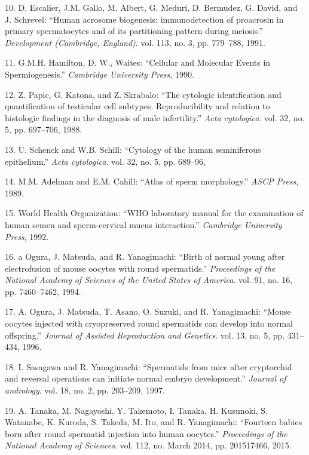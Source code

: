 \documentclass[12pt,twoside]{ugathesis}
\theoremstyle{definition}
\theoremstyle{definition}
\theoremstyle{remark}
\begin{document}
\hypertarget{ref-Escalier1991}{}
10. D. Escalier, J.M. Gallo, M. Albert, G. Meduri, D. Bermudez, G.
David, and J. Schrevel: ``Human acrosome biogenesis: immunodetection of
proacrosin in primary spermatocytes and of its partitioning pattern
during meiosis.'' \emph{Development (Cambridge, England)}. vol. 113, no.
3, pp. 779--788, 1991.

\hypertarget{ref-Hamilton1987}{}
11. G.M.H. Hamilton, D. W., Waites: ``Cellular and Molecular Events in
Spermiogenesis.'' \emph{Cambridge University Press}, 1990.

\hypertarget{ref-Papic}{}
12. Z. Papic, G. Katona, and Z. Skrabalo: ``The cytologic identification
and quantification of testicular cell subtypes. Reproducibility and
relation to histologic findings in the diagnosis of male infertility.''
\emph{Acta cytologica}. vol. 32, no. 5, pp. 697--706, 1988.

\hypertarget{ref-Schenck}{}
13. U. Schenck and W.B. Schill: ``Cytology of the human seminiferous
epithelium.'' \emph{Acta cytologica}. vol. 32, no. 5, pp. 689--96,

\hypertarget{ref-Adelman1989}{}
14. M.M. Adelman and E.M. Cahill: ``Atlas of sperm morphology.''
\emph{ASCP Press}, 1989.

\hypertarget{ref-WorldHealthOrganization1992}{}
15. World Health Organization: ``WHO laboratory manual for the
examination of human semen and sperm-cervical mucus interaction.''
\emph{Cambridge University Press}, 1992.

\hypertarget{ref-Ogura1994}{}
16. a Ogura, J. Matsuda, and R. Yanagimachi: ``Birth of normal young
after electrofusion of mouse oocytes with round spermatids.''
\emph{Proceedings of the National Academy of Sciences of the United
States of America}. vol. 91, no. 16, pp. 7460--7462, 1994.

\hypertarget{ref-Kimura1995}{}
17. A. Ogura, J. Matsuda, T. Asano, O. Suzuki, and R. Yanagimachi:
``Mouse oocytes injected with cryopreserved round spermatids can develop
into normal offspring.'' \emph{Journal of Assisted Reproduction and
Genetics}. vol. 13, no. 5, pp. 431--434, 1996.

\hypertarget{ref-Sasagawa}{}
18. I. Sasagawa and R. Yanagimachi: ``Spermatids from mice after
cryptorchid and reversal operations can initiate normal embryo
development.'' \emph{Journal of andrology}. vol. 18, no. 2, pp.
203--209, 1997.

\hypertarget{ref-Tanaka2015}{}
19. A. Tanaka, M. Nagayoshi, Y. Takemoto, I. Tanaka, H. Kusunoki, S.
Watanabe, K. Kuroda, S. Takeda, M. Ito, and R. Yanagimachi: ``Fourteen
babies born after round spermatid injection into human oocytes.''
\emph{Proceedings of the National Academy of Sciences}. vol. 112, no.
March 2014, pp. 201517466, 2015.
\end{document}
